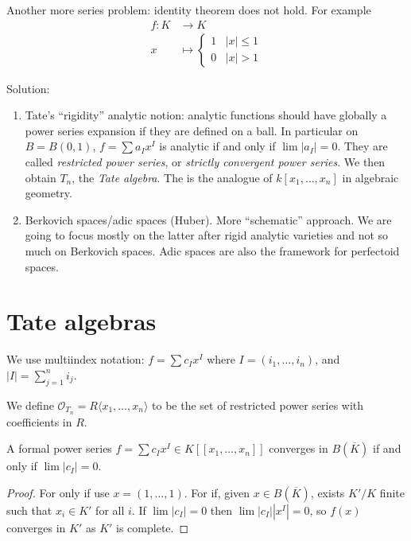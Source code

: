 \documentclass[a4paper]{article}
\begin{document}
Another more series problem: identity theorem does not hold. For example
\begin{align*}
  f: K &\to K \\
  x &\mapsto
      \begin{cases}
        1 & |x| \leq 1 \\
        0 & |x| > 1
      \end{cases}
\end{align*}

Solution:
\begin{enumerate}
\item Tate's ``rigidity'' analytic notion: analytic functions should have globally a power series expansion if they are defined on a ball. In particular on \(B = B(0, 1)\), \(f = \sum a_I x^I\) is analytic if and only if \(\lim |a_I| = 0\). They are called \emph{restricted power series}, or \emph{strictly convergent power series}. We then obtain \(T_n\), the \emph{Tate algebra}. The is the analogue of \(k[x_1, \dots, x_n]\) in algebraic geometry.
\item Berkovich spaces/adic spaces (Huber). More ``schematic'' approach. We are going to focus mostly on the latter after rigid analytic varieties and not so much on Berkovich spaces. Adic spaces are also the framework for perfectoid spaces.
\end{enumerate}

\section{Tate algebras}

\begin{notation}
  We use multiindex notation: \(f = \sum c_I x^I\) where \(I = (i_1, \dots, i_n)\), and \(|I| = \sum_{j = 1}^n i_j\).

  We define \(\mathcal O_{T_n} = R\langle x_1, \dots, x_n\rangle\) to be the set of restricted power series with coefficients in \(R\).
\end{notation}

\begin{lemma}
  A formal power series \(f = \sum c_I x^I \in K[[x_1, \dots, x_n]]\) converges in \(B(\overline K)\) if and only if \(\lim |c_I| = 0\).
\end{lemma}

\begin{proof}
  For only if use \(x = (1, \dots, 1)\). For if, given \(x \in B(\overline K)\), exists \(K'/K\) finite such that \(x_i \in K'\) for all \(i\). If \(\lim |c_I| = 0\) then \(\lim |c_I| |x^I| = 0\), so \(f(x)\) converges in \(K'\) as \(K'\) is complete.
\end{proof}
\end{document}
